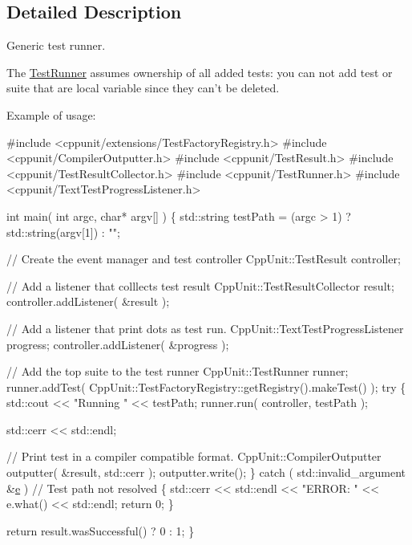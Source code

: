 \subsection{Detailed Description}
Generic test runner.

The \hyperlink{class_test_runner}{Test\-Runner} assumes ownership of all added tests\-: you can not add test or suite that are local variable since they can't be deleted. 

Example of usage\-: 
\begin{DoxyCode}
\textcolor{preprocessor}{#include <cppunit/extensions/TestFactoryRegistry.h>}
\textcolor{preprocessor}{#include <cppunit/CompilerOutputter.h>}
\textcolor{preprocessor}{#include <cppunit/TestResult.h>}
\textcolor{preprocessor}{#include <cppunit/TestResultCollector.h>}
\textcolor{preprocessor}{#include <cppunit/TestRunner.h>}
\textcolor{preprocessor}{#include <cppunit/TextTestProgressListener.h>}


\textcolor{keywordtype}{int} 
main( \textcolor{keywordtype}{int} argc, \textcolor{keywordtype}{char}* argv[] )
\{
  std::string testPath = (argc > 1) ? std::string(argv[1]) : \textcolor{stringliteral}{""};

  \textcolor{comment}{// Create the event manager and test controller}
  CppUnit::TestResult controller;

  \textcolor{comment}{// Add a listener that colllects test result}
  CppUnit::TestResultCollector result;
  controller.addListener( &result );        

  \textcolor{comment}{// Add a listener that print dots as test run.}
  CppUnit::TextTestProgressListener progress;
  controller.addListener( &progress );      

  \textcolor{comment}{// Add the top suite to the test runner}
  CppUnit::TestRunner runner;
  runner.addTest( CppUnit::TestFactoryRegistry::getRegistry().makeTest() );   
  \textcolor{keywordflow}{try}
  \{
    std::cout << \textcolor{stringliteral}{"Running "}  <<  testPath;
    runner.run( controller, testPath );

    std::cerr << std::endl;

    \textcolor{comment}{// Print test in a compiler compatible format.}
    CppUnit::CompilerOutputter outputter( &result, std::cerr );
    outputter.write();                      
  \}
  \textcolor{keywordflow}{catch} ( std::invalid\_argument &\hyperlink{group__gtc__constants_gab83fb6de0f05d6c0d11bdf0479f8319e}{e} )  \textcolor{comment}{// Test path not resolved}
  \{
    std::cerr  <<  std::endl  
               <<  \textcolor{stringliteral}{"ERROR: "}  <<  e.what()
               << std::endl;
    \textcolor{keywordflow}{return} 0;
  \}

  \textcolor{keywordflow}{return} result.wasSuccessful() ? 0 : 1;
\}
\end{DoxyCode}
 

